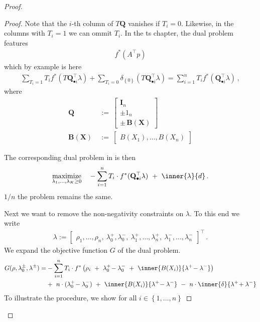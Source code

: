 \begin{proof}
\begin{proof}
Note that the $i$-th column of $T\mathbf{Q}$ vanishes if 
$T_i=0$. Likewise, in the columns with $T_i=1$ we can ommit $T_i$.
In the ts chapter, the dual problem features
\begin{gather}
  f^*(A^\top p)
\end{gather}
which by example is here
\begin{gather*}
  \sum_{T_i=1} T_i f^*(T\mathbf{Q}_{\bullet i}^\top\lambda)
  +
  \sum_{T_i=0} 
  \delta_{\left\{ 0 \right\}}
(T\mathbf{Q}_{\bullet i}^\top\lambda)
  =
  \sum_{i=1}^n T_i f^*(\mathbf{Q}_{\bullet i}^\top\lambda)
  \,,
\end{gather*}
where
\begin{align*}
    \mathbf{Q}
    &
    \ 
    :=
    \ 
    \begin{bmatrix}
      \mathbf{I}_n
      \\
      \pm
      \mathrm{1}_n
      \\
      \pm\,\mathbf{B}(\mathbf{X})
    \end{bmatrix}
    \\
    \mathbf{B}(\mathbf{X})
    &
    \ 
    :=
    \ 
    \begin{bmatrix}
      B(X_1), \ldots, B(X_n)
    \end{bmatrix}
\end{align*}


The corresponding dual problem in \cite{Tseng1991} is then
\begin{gather*}
  \underset
  {\lambda_1,\ldots,\lambda_{K}\ge 0}
  {
  \mathrm{maximize}
  }
  \quad
  -
  \sum_{i=1} 
  ^n
  T_i
  \cdot
  f^*
(\mathbf{Q}_{\bullet i}^\top\lambda)
  \ 
  +
  \ 
  \inner{\lambda}{d}
  \,.
\end{gather*}
  $1/n$ the problem remains the same.

  Next we want to remove the non-negativity constraints on $\lambda$.
  To this end we write
  \begin{gather}
    \lambda
    :=
    \begin{bmatrix}
      \rho_1,
      \ldots,
      \rho_n,
      \ 
      \lambda_0^+,
      \lambda_0^-,
      \ 
      \lambda_1^+,
      \ldots,
      \lambda_n^+,
      \ 
      \lambda_1^-,
      \ldots,
      \lambda_n^-
    \end{bmatrix}
    ^\top
    \,.
  \end{gather}
  We expand the objective function $G$ of the dual problem.
  \begin{align*}
    G
    (
    \rho,
    \lambda_0^\pm,
    \lambda^\pm
    )
    =
  &-
  \sum_{i=1} 
  ^n
  T_i
  \cdot
  f^*
  \left( 
\rho_i
\ 
+
\ 
\lambda_0^+
\!
-
\lambda_0^-
\ 
+
\ 
\inner
{B(X_i)}
{\lambda^+ \!- \lambda^-}
  \right)
  \\
  &+
  \ 
  n
  \cdot
  (
\lambda_0^+
\!
-
\lambda_0^-
  )
  \ 
+
  \ 
\inner
{B(X_i)}
{\lambda^+ \!- \lambda^-}
  \ 
-
  \ 
  n
  \cdot
\inner
{\delta}
{\lambda^+ \!+ \lambda^-}
  \end{align*}
  To illustrate the procedure, we show 
  for all $i \in \left\{ 1,\ldots,n \right\}$



\end{proof}
\end{proof}
